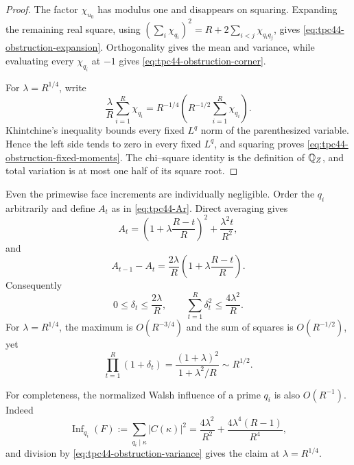 \begin{proof}
The factor \(\chi_{u_0}\) has modulus one and disappears on squaring.
Expanding the remaining real square, using
\(
 (\sum_i\chi_{q_i})^2=R+2\sum_{i<j}\chi_{q_iq_j}
\), gives \eqref{eq:tpc44-obstruction-expansion}.  Orthogonality gives
the mean and variance, while evaluating every \(\chi_{q_i}\) at \(-1\)
gives \eqref{eq:tpc44-obstruction-corner}.

For \(\lambda=R^{1/4}\), write
\begin{equation}
 \frac{\lambda}{R}\sum_{i=1}^{R}\chi_{q_i}
 =R^{-1/4}
  \left(R^{-1/2}\sum_{i=1}^{R}\chi_{q_i}\right).
 \label{eq:tpc44-obstruction-Khintchine-scaling}
\end{equation}
Khintchine's inequality bounds every fixed \(L^q\) norm of the
parenthesized variable.  Hence the left side tends to zero in every
fixed \(L^q\), and squaring proves
\eqref{eq:tpc44-obstruction-fixed-moments}.  The chi--square identity is
the definition of \(\mathbb Q_Z\), and total variation is at most one half of
its square root.
\end{proof}

Even the primewise face increments are individually negligible.  Order
the \(q_i\) arbitrarily and define \(A_t\) as in
\eqref{eq:tpc44-Ar}.  Direct averaging gives
\begin{equation}
 A_t=
 \left(1+\lambda\frac{R-t}{R}\right)^2
 +\frac{\lambda^2t}{R^2},
 \label{eq:tpc44-obstruction-At}
\end{equation}
and
\begin{equation}
 A_{t-1}-A_t
 =\frac{2\lambda}{R}
  \left(1+\lambda\frac{R-t}{R}\right).
 \label{eq:tpc44-obstruction-Lt}
\end{equation}
Consequently
\begin{equation}
 0\le\delta_t\le\frac{2\lambda}{R},
 \qquad
 \sum_{t=1}^{R}\delta_t^2\le\frac{4\lambda^2}{R}.
 \label{eq:tpc44-obstruction-small-deltas}
\end{equation}
For \(\lambda=R^{1/4}\), the maximum is \(O(R^{-3/4})\) and the sum of
squares is \(O(R^{-1/2})\), yet
\begin{equation}
 \prod_{t=1}^{R}(1+\delta_t)
 =\frac{(1+\lambda)^2}{1+\lambda^2/R}
 \sim R^{1/2}.
 \label{eq:tpc44-obstruction-delta-product}
\end{equation}

For completeness, the normalized Walsh influence of a prime \(q_i\)
is also \(O(R^{-1})\).  Indeed
\begin{equation}
 \operatorname{Inf}_{q_i}(F)
 :=\sum_{q_i\mid\kappa}|C(\kappa)|^2
 =\frac{4\lambda^2}{R^2}
  +\frac{4\lambda^4(R-1)}{R^4},
 \label{eq:tpc44-obstruction-influence}
\end{equation}
and division by \eqref{eq:tpc44-obstruction-variance} gives the claim at
\(\lambda=R^{1/4}\).

